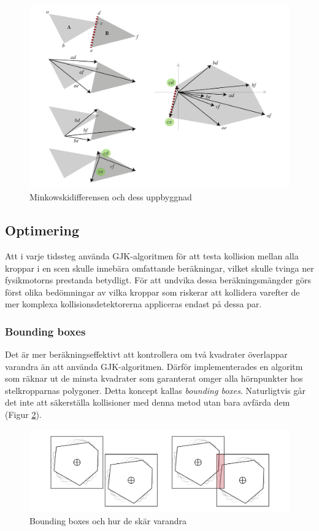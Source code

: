 \documentclass[a4paper,12pt,twopage,swedish]{article}
\begin{document}
\begin{figure}[H]
\centering
\includegraphics[width=1\textwidth]{illustrations/gjk.pdf}
\caption{Minkowskidifferensen och dess uppbyggnad}
\label{fig:gjk}
\end{figure}

\subsection{Optimering}

Att i varje tidssteg använda GJK-algoritmen för att testa kollision mellan alla kroppar i en scen skulle innebära omfattande beräkningar, vilket skulle tvinga ner fysikmotorns prestanda betydligt. För att undvika dessa beräkningsmängder görs först olika bedömningar av vilka kroppar som riskerar att kollidera varefter de mer komplexa kollisionsdetektorerna appliceras endast på dessa par.

\subsubsection{Bounding boxes}
Det är mer beräkningseffektivt att kontrollera om två kvadrater överlappar varandra än att använda GJK-algoritmen. Därför implementerades en algoritm som räknar ut de minsta kvadrater som garanterat omger alla hörnpunkter hos stelkropparnas polygoner. Detta koncept kallas \emph{bounding boxes}. Naturligtvis går det inte att säkerställa kollisioner med denna metod utan bara avfärda dem (Figur \ref{fig:bounding_boxes}).

\begin{figure}[H]
\centering
\includegraphics[width=1\textwidth]{illustrations/boundingbox.pdf}
\caption{Bounding boxes och hur de skär varandra}
\label{fig:bounding_boxes}
\end{figure}
\end{document}
